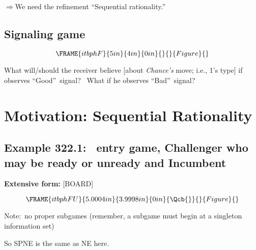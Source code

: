 \documentclass{article}
\begin{document}
$\Rightarrow $We need the refinement \textquotedblleft Sequential
rationality.\textquotedblright 

\bigskip 

\bigskip 

\subsection{Signaling game}

\[
\FRAME{itbphF}{5in}{4in}{0in}{}{}{Figure}{\special{language "Scientific
Word";type "GRAPHIC";maintain-aspect-ratio TRUE;display "USEDEF";valid_file
"T";width 5in;height 4in;depth 0in;original-width 7.8006in;original-height
5.7164in;cropleft "0";croptop "1";cropright "1";cropbottom "0";tempfilename
'JSH9C61V.wmf';tempfile-properties "XPR";}}
\]

What will/should the receiver believe [about \textit{Chance's }move; i.e.,
1's type] if observes \textquotedblleft Good\textquotedblright\ signal? \
What if he observes \textquotedblleft Bad\textquotedblright\ signal?

\bigskip 

\section{Motivation: Sequential Rationality}

\subsection{Example 322.1: \ entry game, Challenger who may be ready or
unready and Incumbent}

\textbf{Extensive form: }[BOARD]\textbf{\bigskip }

\begin{equation}
\FRAME{itbphFU}{5.0004in}{3.9998in}{0in}{\Qcb{}}{}{Figure}{\special{language
"Scientific Word";type "GRAPHIC";maintain-aspect-ratio TRUE;display
"USEDEF";valid_file "T";width 5.0004in;height 3.9998in;depth
0in;original-width 5.6886in;original-height 3.5201in;cropleft "0";croptop
"1";cropright "1";cropbottom "0";tempfilename
'JSH9C61W.wmf';tempfile-properties "XPR";}}
\end{equation}

Note:\ no proper subgames (remember, a subgame must begin at a singleton
information set)

So SPNE is the same as NE here.\bigskip 

\bigskip 

\bigskip 
\end{document}
